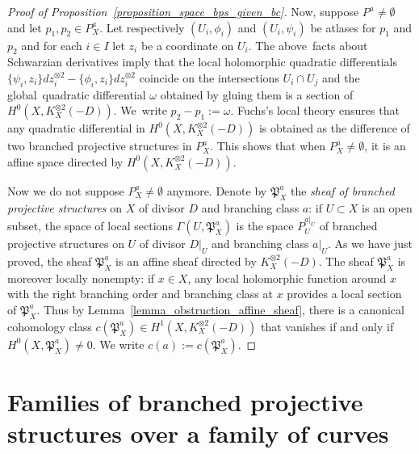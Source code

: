 \documentclass[JEP,XML,SOM,Unicode,NoEqCountersInSection,published]{cedram}
\theoremstyle{definition}
\theoremstyle{plain}
\begin{document}
\begin{proof}[Proof of Proposition~\ref{proposition_space_bps_given_bc}]
Now, suppose $P^a \!\neq\! \emptyset$ and let $p_1, p_2\!\in\! P_X^a$.
Let respectively $(U_i, \phi_i)$ and $(U_i, \psi_i)$ be atlases for $p_1$ and $p_2$ and for each $i \in I$ let $z_i$ be a coordinate on $U_i$.
The above~facts about Schwarzian derivatives imply that the local holomorphic \hbox{quadratic} \hbox{differentials} $\{\psi_i, z_i\}dz_i^{\otimes 2} \!-\! \{\phi_i, z_i\}dz_i^{\otimes 2}$ coincide on the intersections $U_i \cap U_j$ and the global~quadratic differential $\omega$ obtained by gluing them is a section of $H^0(X, K_X^{\otimes 2}(-D))$.
We~write $p_2-p_1:= \omega$. Fuchs's local theory ensures that any quadratic differential in $H^0(X, K_X^{\otimes 2}(-D))$ is obtained as the difference of two branched projective structures in $P_X^a$. This shows that when $P_X^a \neq \emptyset$, it is an affine space directed by $H^0(X, K_X^{\otimes 2}(-D))$.\enlargethispage{.5\baselineskip}%

Now we do not suppose $P_X^a \neq \emptyset$ anymore.
Denote by $\mathfrak P_X^a$ the \emph{sheaf of branched projective structures} on $X$ of divisor $D$ and branching class $a$: if $U \subset X$ is an open subset, the space of local sections $\Gamma\left(U, \mathfrak P_X^a\right)$ is the space $P_U^{a|_U}$ of branched projective structures on $U$ of divisor $D|_U$ and branching class $a|_U$.
As we have just proved, the sheaf $\mathfrak P_X^a$ is an affine sheaf directed by $K_X^{\otimes 2}(-D)$.
The sheaf $\mathfrak P_X^a$ is moreover locally nonempty: if $x \in X$, any local holomorphic function around $x$ with the right branching order and branching class at $x$ provides a local section of $\mathfrak P_X^a$.
Thus by Lemma~\ref{lemma_obstruction_affine_sheaf}, there is a canonical cohomology class $c\left(\mathfrak P_X^a\right) \in H^1\left(X, K_X^{\otimes 2}(-D)\right)$ that vanishes if and only if $H^0\left(X, \mathfrak P_X^a\right) \neq 0$.
We write $c(a):= c\left(\mathfrak P_X^a\right)$.
\end{proof}

\section{Families of branched projective structures over a family of curves}\label{section_families_branched_projective_structures}
\end{document}
